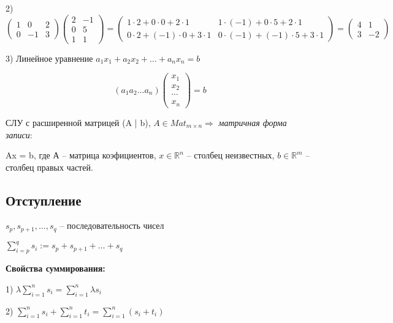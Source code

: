 2) \[\begin{pmatrix}
1 & 0 & 2 \\
0 & -1 & 3
\end{pmatrix} \begin{pmatrix}
2 & -1 \\
0 & 5 \\
1 & 1
\end{pmatrix} = \begin{pmatrix}
1 \cdot 2 + 0 \cdot 0 + 2 \cdot 1 & 1 \cdot (-1) + 0 \cdot 5 + 2 \cdot 1 \\
0 \cdot 2 + (-1) \cdot 0 + 3 \cdot 1 & 0 \cdot (-1) + (-1) \cdot 5 + 3 \cdot 1 \end{pmatrix} = \begin{pmatrix}
4 & 1 \\
3 & -2 \end{pmatrix} \]

3) Линейное уравнение $a_1 x_1 + a_2 x_2 + \dots + a_n x_n = b$

\[(a_1 a_2 \dots a_n) \begin{pmatrix}
    x_1 \\
    x_2 \\
    \cdots \\
   x_n
	\end{pmatrix} = b
\]

СЛУ с расширенной матрицей (A | b), $A \in Mat_{m \times n}
\Rightarrow$ \textit{матричная форма записи}:

Ax = b, где А -- матрица коэфициентов, $x \in \mathbb{R}^n$ -- столбец неизвестных, $b \in \mathbb{R}^m$ -- столбец правых частей.

\vspace{\baselineskip}
\subsection{Отступление} 

$s_p, s_{p+1}, \dots, s_q$ -- последовательность чисел

$\sum\limits_{i=p}^q s_i := s_p + s_{p+1} + \dots + s_q$

\vspace{\baselineskip}
\textbf{Свойства суммирования: }

1) $\lambda \sum\limits_{i=1}^n s_i = \sum\limits_{i=1}^n \lambda s_i$

\vspace{\baselineskip}
2) $\sum\limits_{i=1}^n s_i + \sum\limits_{i=1}^n t_i = \sum\limits_{i=1}^n (s_i + t_i)$

